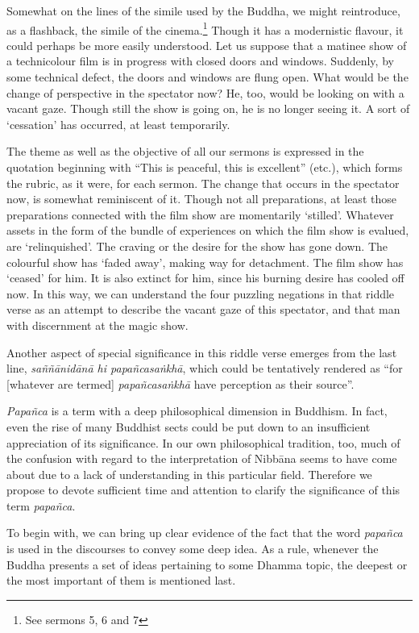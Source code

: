Somewhat on the lines of the simile used by the Buddha, we might reintroduce, as a flashback, the simile of the cinema.\footnote{See sermons 5, 6 and 7} Though it has a modernistic flavour, it could perhaps be more easily understood. Let us suppose that a matinee show of a technicolour film is in progress with closed doors and windows. Suddenly, by some technical defect, the doors and windows are flung open. What would be the change of perspective in the spectator now? He, too, would be looking on with a vacant gaze. Though still the show is going on, he is no longer seeing it. A sort of `cessation' has occurred, at least temporarily.

The theme as well as the objective of all our sermons is expressed in the quotation beginning with ``This is peaceful, this is excellent'' (etc.), which forms the rubric, as it were, for each sermon. The change that occurs in the spectator now, is somewhat reminiscent of it. Though not all preparations, at least those preparations connected with the film show are momentarily `stilled'. Whatever assets in the form of the bundle of experiences on which the film show is evalued, are `relinquished'. The craving or the desire for the show has gone down. The colourful show has `faded away', making way for detachment. The film show has `ceased' for him. It is also extinct for him, since his burning desire has cooled off now. In this way, we can understand the four puzzling negations in that riddle verse as an attempt to describe the vacant gaze of this spectator, and that man with discernment at the magic show.

Another aspect of special significance in this riddle verse emerges from the last line, \emph{saññānidānā hi papañcasaṅkhā}, which could be tentatively rendered as ``for {[}whatever are termed{]} \emph{papañcasaṅkhā} have perception as their source''.

\emph{Papañca} is a term with a deep philosophical dimension in Buddhism. In fact, even the rise of many Buddhist sects could be put down to an insufficient appreciation of its significance. In our own philosophical tradition, too, much of the confusion with regard to the interpretation of Nibbāna seems to have come about due to a lack of understanding in this particular field. Therefore we propose to devote sufficient time and attention to clarify the significance of this term \emph{papañca}.

To begin with, we can bring up clear evidence of the fact that the word \emph{papañca} is used in the discourses to convey some deep idea. As a rule, whenever the Buddha presents a set of ideas pertaining to some Dhamma topic, the deepest or the most important of them is mentioned last.

